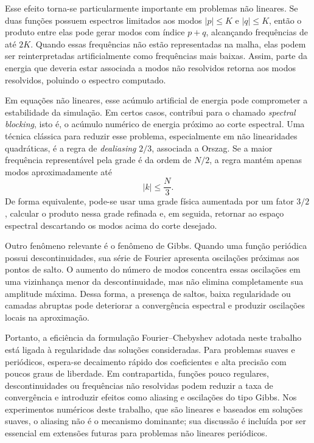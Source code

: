 Esse efeito torna-se particularmente importante em problemas não lineares. Se duas funções possuem espectros limitados aos modos \(|p|\leq K\) e \(|q|\leq K\), então o produto entre elas pode gerar modos com índice \(p+q\), alcançando frequências de até \(2K\). Quando essas frequências não estão representadas na malha, elas podem ser reinterpretadas artificialmente como frequências mais baixas. Assim, parte da energia que deveria estar associada a modos não resolvidos retorna aos modos resolvidos, poluindo o espectro computado.

Em equações não lineares, esse acúmulo artificial de energia pode comprometer a estabilidade da simulação. Em certos casos, contribui para o chamado \emph{spectral blocking}, isto é, o acúmulo numérico de energia próximo ao corte espectral. Uma técnica clássica para reduzir esse problema, especialmente em não linearidades quadráticas, é a regra de \emph{dealiasing} \(2/3\), associada a Orszag. Se a maior frequência representável pela grade é da ordem de \(N/2\), a regra mantém apenas modos aproximadamente até
\[
|k|\leq \frac{N}{3}.
\]
De forma equivalente, pode-se usar uma grade física aumentada por um fator \(3/2\), calcular o produto nessa grade refinada e, em seguida, retornar ao espaço espectral descartando os modos acima do corte desejado.

Outro fenômeno relevante é o fenômeno de Gibbs. Quando uma função periódica possui descontinuidades, sua série de Fourier apresenta oscilações próximas aos pontos de salto. O aumento do número de modos concentra essas oscilações em uma vizinhança menor da descontinuidade, mas não elimina completamente sua amplitude máxima. Dessa forma, a presença de saltos, baixa regularidade ou camadas abruptas pode deteriorar a convergência espectral e produzir oscilações locais na aproximação.

Portanto, a eficiência da formulação Fourier--Chebyshev adotada neste trabalho está ligada à regularidade das soluções consideradas. Para problemas suaves e periódicos, espera-se decaimento rápido dos coeficientes e alta precisão com poucos graus de liberdade. Em contrapartida, funções pouco regulares, descontinuidades ou frequências não resolvidas podem reduzir a taxa de convergência e introduzir efeitos como aliasing e oscilações do tipo Gibbs. Nos experimentos numéricos deste trabalho, que são lineares e baseados em soluções suaves, o aliasing não é o mecanismo dominante; sua discussão é incluída por ser essencial em extensões futuras para problemas não lineares periódicos.

